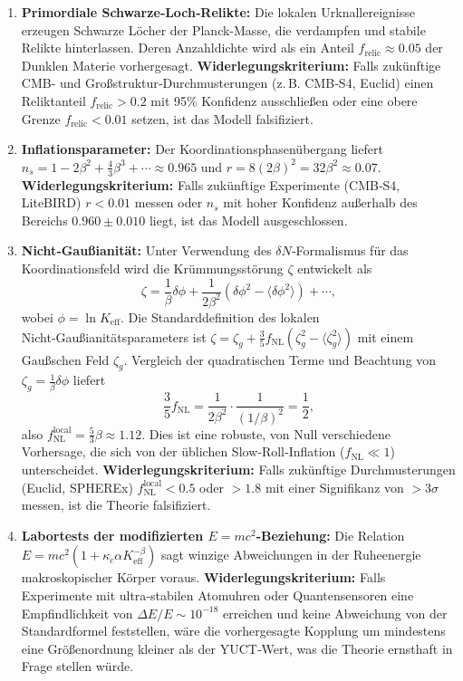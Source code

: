 \documentclass[11pt,a4paper]{article}
\newcommand{\Keff}{K_{\mathrm{eff}}}
\begin{document}
	\begin{enumerate}
		\item \textbf{Primordiale Schwarze‑Loch‑Relikte:} Die lokalen Urknallereignisse erzeugen Schwarze Löcher der Planck‑Masse, die verdampfen und stabile Relikte hinterlassen. Deren Anzahldichte wird als ein Anteil \(f_{\mathrm{relic}} \approx 0.05\) der Dunklen Materie vorhergesagt. \textbf{Widerlegungskriterium:} Falls zukünftige CMB- und Großstruktur‑Durchmusterungen (z. B. CMB‑S4, Euclid) einen Reliktanteil \(f_{\mathrm{relic}} > 0.2\) mit 95\% Konfidenz ausschließen oder eine obere Grenze \(f_{\mathrm{relic}} < 0.01\) setzen, ist das Modell falsifiziert.
		\item \textbf{Inflationsparameter:} Der Koordinationsphasenübergang liefert \(n_s = 1 - 2\beta^2 + \frac{4}{3}\beta^3 + \cdots \approx 0.965\) und \(r = 8(2\beta)^2 = 32\beta^2 \approx 0.07\). \textbf{Widerlegungskriterium:} Falls zukünftige Experimente (CMB‑S4, LiteBIRD) \(r < 0.01\) messen oder \(n_s\) mit hoher Konfidenz außerhalb des Bereichs \(0.960 \pm 0.010\) liegt, ist das Modell ausgeschlossen.
		\item \textbf{Nicht‑Gaußianität:} Unter Verwendung des \(\delta N\)‑Formalismus für das Koordinationsfeld wird die Krümmungsstörung \(\zeta\) entwickelt als
		\[
		\zeta = \frac{1}{\beta} \delta\phi + \frac{1}{2\beta^2} (\delta\phi^2 - \langle\delta\phi^2\rangle) + \cdots,
		\]
		wobei \(\phi = \ln \Keff\). Die Standarddefinition des lokalen Nicht‑Gaußianitätsparameters ist \(\zeta = \zeta_g + \frac{3}{5} f_{\mathrm{NL}} (\zeta_g^2 - \langle\zeta_g^2\rangle)\) mit einem Gaußschen Feld \(\zeta_g\). Vergleich der quadratischen Terme und Beachtung von \(\zeta_g = \frac{1}{\beta}\delta\phi\) liefert
		\[
		\frac{3}{5} f_{\mathrm{NL}} = \frac{1}{2\beta^2} \cdot \frac{1}{(1/\beta)^2} = \frac{1}{2},
		\]
		also \(f_{\mathrm{NL}}^{\mathrm{local}} = \frac{5}{3}\beta \approx 1.12\). Dies ist eine robuste, von Null verschiedene Vorhersage, die sich von der üblichen Slow‑Roll‑Inflation (\(f_{\mathrm{NL}} \ll 1\)) unterscheidet. \textbf{Widerlegungskriterium:} Falls zukünftige Durchmusterungen (Euclid, SPHEREx) \(f_{\mathrm{NL}}^{\mathrm{local}} < 0.5\) oder \(> 1.8\) mit einer Signifikanz von \(>3\sigma\) messen, ist die Theorie falsifiziert.
		\item \textbf{Labortests der modifizierten \(E=mc^2\)‑Beziehung:} Die Relation \(E = m c^2 (1 + \kappa_c \alpha K_{\mathrm{eff}}^{-\beta})\) sagt winzige Abweichungen in der Ruheenergie makroskopischer Körper voraus. \textbf{Widerlegungskriterium:} Falls Experimente mit ultra‑stabilen Atomuhren oder Quantensensoren eine Empfindlichkeit von \(\Delta E / E \sim 10^{-18}\) erreichen und keine Abweichung von der Standardformel feststellen, wäre die vorhergesagte Kopplung um mindestens eine Größenordnung kleiner als der YUCT‑Wert, was die Theorie ernsthaft in Frage stellen würde.
	\end{enumerate}
	
\end{document}
